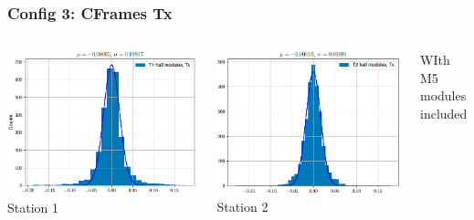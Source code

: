 \documentclass[aspectratio=1610, 12pt, xcolor=dvipsnames]{beamer}
\begin{document}
\begin{frame}\frametitle{Config 3: CFrames Tx}
  \begin{columns}
    \begin{column}[c]{0.33\textwidth}
      \includegraphics[width=\textwidth]{plots/2025_plots_precision/T1.png}
      Station 1
    \end{column}
    \begin{column}[c]{0.33\textwidth}
      \includegraphics[width=\textwidth]{plots/2025_plots_precision/T2.png}
      Station 2
    \end{column}
    \begin{column}[c]{0.33\textwidth}
      WIth M5 modules included

\end{column}
\end{columns}
\end{frame}
\end{document}
